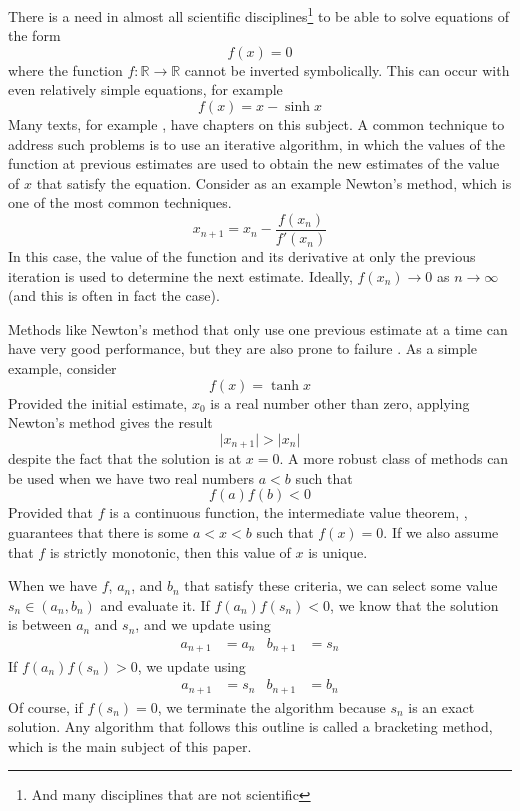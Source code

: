 \documentclass{../aiaa-pretty}
\begin{document}
There is a need in almost all scientific disciplines\footnote{And many disciplines that are not scientific} to be able to solve equations of the form
\begin{equation}
f(x)=0
\end{equation}
where the function $f:\mathbb{R}\to\mathbb{R}$ cannot be inverted symbolically.  This can occur with even relatively simple equations, for example
\begin{equation}
f(x)=x - \sinh x
\end{equation}
Many texts, for example \cite{chapra:2002:numerics}, have chapters on this subject.  A common technique to address such problems is to use an iterative algorithm, in which the values of the function at previous estimates are used to obtain the new estimates of the value of $x$ that satisfy the equation.  Consider as an example Newton's method, which is one of the most common techniques.
\begin{equation}
x_{n+1} = x_n - \frac{f(x_n)}{f'(x_n)}
\end{equation}
In this case, the value of the function and its derivative at only the previous iteration is used to determine the next estimate.  Ideally, $f(x_n)\to 0$ as $n\to\infty$ (and this is often in fact the case).

Methods like Newton's method that only use one previous estimate at a time can have very good performance, but they are also prone to failure \cite{ypma:1995:newton-raphson}.  As a simple example, consider
\begin{equation}
f(x) = \tanh x
\end{equation}
Provided the initial estimate, $x_0$ is a real number other than zero, applying Newton's method gives the result
\begin{equation}
\lvert x_{n+1} \rvert > \lvert x_n \rvert
\end{equation}
despite the fact that the solution is at $x=0$.  A more robust class of methods can be used when we have two real numbers $a<b$ such that
\begin{equation}
f(a)f(b) < 0
\end{equation}
Provided that $f$ is a continuous function, the intermediate value theorem, \cite{rudin:1976:analysis}, guarantees that there is some $a < x < b$ such that $f(x)=0$.  If we also assume that $f$ is strictly monotonic, then this value of $x$ is unique.

When we have $f$, $a_n$, and $b_n$ that satisfy these criteria, we can select some value $s_n \in (a_n,b_n)$ and evaluate it.  If $f(a_n)f(s_n)<0$, we know that the solution is between $a_n$ and $s_n$, and we update using
\begin{align}
a_{n+1}&=a_n & b_{n+1}&=s_n
\end{align}
If $f(a_n)f(s_n)>0$, we update using
\begin{align}
a_{n+1}&=s_n & b_{n+1}&=b_n
\end{align}
Of course, if $f(s_n)=0$, we terminate the algorithm because $s_n$ is an exact solution.  Any algorithm that follows this outline is called a bracketing method, which is the main subject of this paper.
\end{document}
